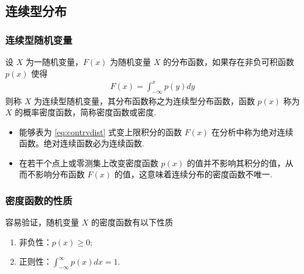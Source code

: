 

\subsection{连续型分布}

\begin{frame}
	\frametitle{连续型随机变量}
	\begin{defi}[连续型随机变量] 设 $X$ 为一随机变量，$F (x)$ 为随机变量 $X$ 的分布函数，如果存在非负可积函数 $p (x)$ 使得
		\begin{eqnarray}\label{eq:contrvdist}
			F(x)=\int_{-\infty}^xp(y)dy
		\end{eqnarray}
		则称 $X$ 为连续型随机变量，其分布函数称之为连续型分布函数，函数 $p (x)$ 称为 $X$ 的概率密度函数，简称密度函数或密度.
	\end{defi}
	\pause
	\begin{rmk}
		\begin{itemize}[<+-|alert@+>]
			\item 能够表为 \eqref{eq:contrvdist} 式变上限积分的函数 $F (x)$ 在分析中称为绝对连续函数。绝对连续函数必为连续函数.
			\item 在若干个点上或零测集上改变密度函数 $p (x)$ 的值并不影响其积分的值，从而不影响分布函数 $F (x)$ 的值，这意味着连续分布的密度函数不唯一.
		\end{itemize}
	\end{rmk}

\end{frame}

\begin{frame}
	\frametitle{密度函数的性质}
	容易验证，随机变量 $X$ 的密度函数有以下性质
	\begin{enumerate}[<+-|alert@+>]
		\item 非负性：$p (x)\ge 0$;
		\item 正则性：$\int_{-\infty}^\infty p (x) dx=1$.
	\end{enumerate}

\end{frame}


